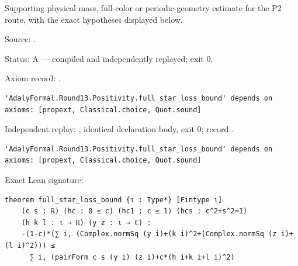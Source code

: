 \begin{theorem}[bp-458]
\label{bp-458}
\leanok
Supporting physical mass, full-color or periodic-geometry estimate for the P2 route, with the exact hypotheses displayed below.

\par Source: \texttt{}.
\par Status: A — compiled and independently replayed; exit 0.
\par Axiom record: \texttt{}.
\begin{verbatim}
'AdalyFormal.Round13.Positivity.full_star_loss_bound' depends on axioms: [propext, Classical.choice, Quot.sound]
\end{verbatim}
\par Independent replay: \texttt{}, identical declaration body, exit 0; record \texttt{}.
\begin{verbatim}
'AdalyFormal.Round13.Positivity.full_star_loss_bound' depends on axioms: [propext, Classical.choice, Quot.sound]
\end{verbatim}
\par Exact Lean signature:
\begin{verbatim}
theorem full_star_loss_bound {ι : Type*} [Fintype ι]
    (c s : ℝ) (hc : 0 ≤ c) (hc1 : c ≤ 1) (hcs : c^2+s^2=1)
    (h k l : ι → ℝ) (y z : ι → ℂ) :
    -(1-c)*(∑ i, (Complex.normSq (y i)+(k i)^2+(Complex.normSq (z i)+(l i)^2))) ≤
      ∑ i, (pairForm c s (y i) (z i)+c*(h i+k i+l i)^2)
\end{verbatim}
\end{theorem}

